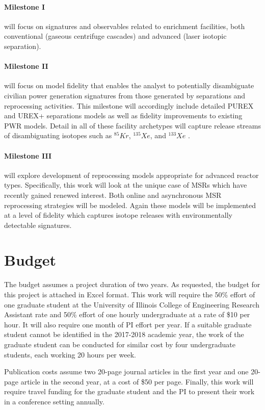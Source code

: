 \documentclass[11pt,letterpaper]{article}
\begin{document}
\paragraph{Milestone I} will focus on signatures and observables related to 
enrichment facilities, both conventional (gaseous centrifuge cascades) and 
advanced (laser isotopic separation). 

\paragraph{Milestone II} will focus on model fidelity that enables the analyst 
to potentially disambiguate civilian power generation signatures from those 
generated by separations and reprocessing activities. This milestone will 
accordingly include detailed PUREX and UREX+ separations models as well as 
fidelity improvements to existing \gls{PWR} models. Detail in all of these 
facility archetypes will capture release streams of disambiguating 
isotopes such as $^{85}Kr$, $^{135}Xe$, and $^{133}Xe$ 
\cite{kalinowski_isotopic_2006,kemp_environmental_2016}.

\paragraph{Milestone III} will explore development of reprocessing models 
appropriate for advanced reactor types. Specifically, this work will look at 
the unique case of \glspl{MSR} which have recently gained renewed interest. 
Both online and asynchronous \gls{MSR} reprocessing strategies will be modeled. 
Again these models will be implemented at a level of fidelity which captures 
isotope releases with environmentally detectable signatures. 






\pagebreak
\section*{Budget}
The budget assumes a project duration of two years.  
As requested, the budget for this project is attached in Excel format.
This work will require the 
50\% effort of one graduate student at the University of Illinois College of 
Engineering Research Assistant rate and 50\% effort of one hourly undergraduate 
at a rate of \$10 per hour.  It will also require one month of \gls{PI} effort 
per year. If a suitable graduate student cannot be identified in the 2017-2018 
academic year, the work of the graduate student can be conducted for similar 
cost by four undergraduate students, each working 20 hours per week.  

Publication costs assume two 20-page journal articles in the first year and one 
20-page article in the second year, at a cost of \$50 per page.  Finally, this 
work will require travel funding for the graduate student and the \gls{PI} to 
present their work in a conference setting annually.  
\end{document}
